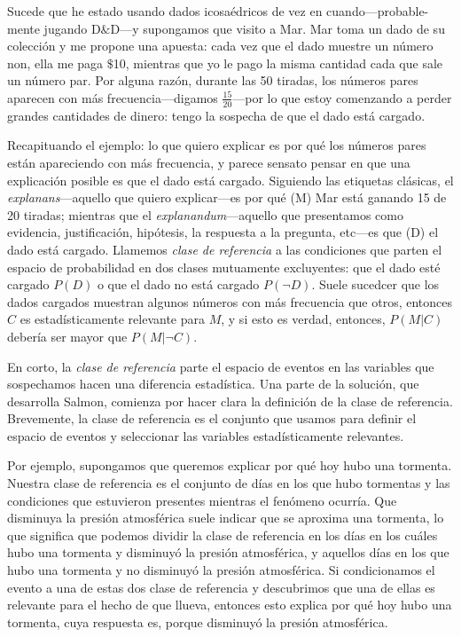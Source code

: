 Sucede que he estado usando dados icosaédricos de vez en cuando---probable-mente jugando D$ \& $D---y supongamos que visito a Mar. Mar toma un dado de su colección y me propone una apuesta: cada vez que el dado muestre un número non, ella me paga $ \$ $10, mientras que yo le pago la misma cantidad cada que sale un número par. Por alguna razón, durante las 50 tiradas, los números pares aparecen con más frecuencia---digamos $ \frac{ 15 }{ 20 } $---por lo que estoy
comenzando a perder grandes cantidades de dinero: tengo la sospecha de que el dado está cargado.

Recapituando el ejemplo: lo que quiero explicar es por qué los
números pares están apareciendo con más frecuencia, y parece sensato pensar en que una explicación posible es que el dado está cargado. Siguiendo las etiquetas clásicas, el \emph{explanans}---aquello que quiero explicar---es por qué (M) Mar está ganando 15 de 20 tiradas; mientras que el \emph {explanandum}---aquello que presentamos como evidencia, justificación, hipótesis, la respuesta a la pregunta,
etc---es que (D) el dado está cargado. Llamemos \emph{clase de
referencia} a las condiciones que parten el espacio de probabilidad en dos clases mutuamente excluyentes: que el dado esté cargado $ P( D ) $ o que el dado no está cargado $ P( \neg D ) $. Suele sucedcer que los dados cargados muestran algunos números con más frecuencia que otros, entonces $ C $ es estadísticamente relevante para $ M $, y si esto es
verdad, entonces, $ P( M | C ) $ debería ser mayor que $  P( M | \neg C ) $.

En corto, la \emph{clase de referencia} parte el espacio de eventos en las variables que sospechamos hacen una diferencia estadística. Una parte de la solución, que desarrolla Salmon, comienza por hacer clara la definición de la clase de referencia. Brevemente, la clase de referencia es el conjunto que usamos para definir el espacio de eventos y seleccionar las variables estadísticamente relevantes.

Por ejemplo, supongamos que queremos explicar por qué hoy hubo una tormenta. Nuestra clase de referencia es el conjunto de días en los que hubo tormentas y las condiciones que estuvieron presentes mientras el fenómeno ocurría. Que disminuya la presión atmosférica suele indicar que se aproxima una tormenta, lo que significa que podemos dividir la clase de referencia en los días en los cuáles hubo una tormenta y disminuyó la presión atmosférica, y aquellos días en los que hubo una tormenta y no disminuyó la presión atmosférica. Si condicionamos el evento a una de estas dos clase de referencia y descubrimos que una de ellas es relevante para el hecho de que llueva, entonces esto explica por qué hoy hubo una tormenta, cuya respuesta es, porque disminuyó la presión atmosférica.

